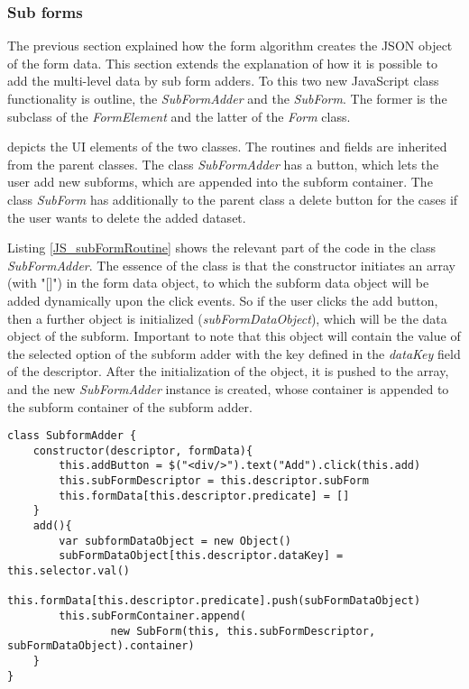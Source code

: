 \subsubsection{Sub forms}

The previous section explained how the form algorithm creates the JSON object of the form data. This section extends the explanation of how it is possible to add the multi-level data by sub form adders. To this two new JavaScript class functionality is outline, the \textit{SubFormAdder} and the \textit{SubForm}. The former is the subclass of the \textit{FormElement} and the latter of the \textit{Form} class.


 depicts the UI elements of the two classes. The routines and fields are inherited from the parent classes. The class \textit{SubFormAdder} has a button, which lets the user add new subforms, which are appended into the subform container. The class \textit{SubForm} has additionally to the parent class a delete button for the cases if the user wants to delete the added dataset.  

Listing \ref{JS_subFormRoutine} shows the relevant part of the code in the class \textit{SubFormAdder}. The essence of the class is that the constructor initiates an array (with "[]") in the form data object, to which the subform data object will be added dynamically upon the click events. So if the user clicks the add button, then a further object is initialized (\textit{subFormDataObject}), which will be the data object of the subform. Important to note that this object will contain the value of the selected option of the subform adder with the key defined in the \textit{dataKey} field of the descriptor. After the initialization of the object, it is pushed to the array, and the new \textit{SubFormAdder} instance is created, whose container is appended to the subform container of the subform adder. 

\begin{lstlisting}[basicstyle=\footnotesize, frame=single, caption={Sub form adder routine}, label=JS_subFormRoutine, captionpos=b, belowskip=1em, aboveskip=2em]
class SubformAdder {
	constructor(descriptor, formData){
		this.addButton = $("<div/>").text("Add").click(this.add)    
		this.subFormDescriptor = this.descriptor.subForm
		this.formData[this.descriptor.predicate] = []
	}
	add(){
		var subformDataObject = new Object()
		subFormDataObject[this.descriptor.dataKey] = this.selector.val()
		this.formData[this.descriptor.predicate].push(subFormDataObject) 
		this.subFormContainer.append(
				new SubForm(this, this.subFormDescriptor, subFormDataObject).container)
	}
}
\end{lstlisting}

